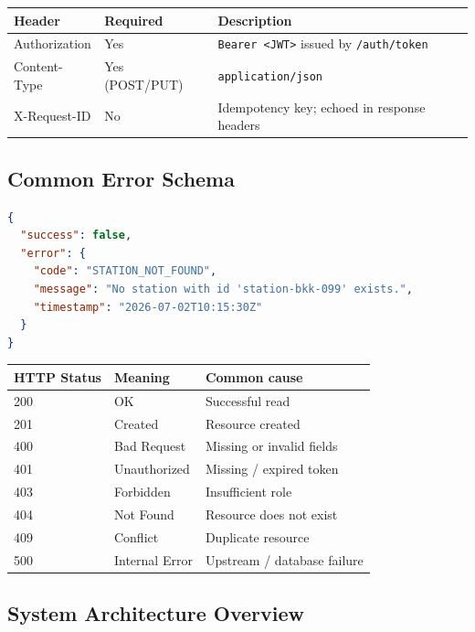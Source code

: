 \documentclass{article}
\begin{document}
\begin{center}
\begin{tabular}{>{\ttfamily}lll}
\toprule
\textbf{Header} & \textbf{Required} & \textbf{Description}\\
\midrule
Authorization & Yes & \texttt{Bearer <JWT>} issued by \texttt{/auth/token}\\
Content-Type  & Yes (POST/PUT) & \texttt{application/json}\\
X-Request-ID  & No  & Idempotency key; echoed in response headers\\
\bottomrule
\end{tabular}
\end{center}

\subsection{Common Error Schema}

\begin{lstlisting}[language=json, caption=Error response envelope]
{
  "success": false,
  "error": {
    "code": "STATION_NOT_FOUND",
    "message": "No station with id 'station-bkk-099' exists.",
    "timestamp": "2026-07-02T10:15:30Z"
  }
}
\end{lstlisting}

\begin{center}
\begin{tabular}{lll}
\toprule
\textbf{HTTP Status} & \textbf{Meaning} & \textbf{Common cause}\\
\midrule
200 & OK & Successful read\\
201 & Created & Resource created\\
400 & Bad Request & Missing or invalid fields\\
401 & Unauthorized & Missing / expired token\\
403 & Forbidden & Insufficient role\\
404 & Not Found & Resource does not exist\\
409 & Conflict & Duplicate resource\\
500 & Internal Error & Upstream / database failure\\
\bottomrule
\end{tabular}
\end{center}

\subsection{System Architecture Overview}
\end{document}
